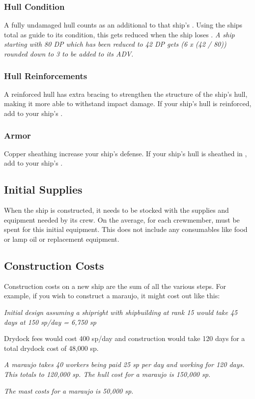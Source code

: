 \begin{multicols*}{2}
\subsubsection{Hull Condition}
A fully undamaged hull counts as an additional  to that ship’s \ADV. Using the ships \DP total as guide to its condition, this gets reduced when the ship loses \DP. \textit{A ship starting with 80 DP which has been reduced to 42 DP gets (6 x (42 / 80)) rounded down to 3 to be added to its ADV.}
\subsubsection{Hull Reinforcements}
A reinforced hull has extra bracing to strengthen the structure of the ship’s hull, making it more able to withstand impact damage. If your ship’s hull is reinforced, add  to your ship’s \ADV.
\subsubsection{Armor}
Copper sheathing increase your ship’s defense. If your ship’s hull is sheathed in , add  to your ship’s \ADV.
\subsection{Initial Supplies}
When the ship is constructed, it needs to be stocked with the supplies and equipment needed by its crew. On the average, for each crewmember, \result{200 sp} must be spent for this initial equipment. This does not include any consumables like food or lamp oil or replacement equipment.
\subsection{Construction Costs}
Construction costs on a new ship are the sum of all
the various steps. For example, if you wish to construct a
maraujo, it might cost out like this:

\textit{Initial design assuming a shipright with shipbuilding at rank 15 would take 45 days at 150 sp/day = 6,750 sp}

Drydock fees would cost 400 sp/day and construction would take 120 days for a total drydock cost of 48,000 sp.

\textit{A maraujo takes 40 workers being paid 25 sp per day and working for 120 days. This totals to 120,000 sp. The hull cost for a maraujo is 150,000 sp.}

\textit{The mast costs for a maraujo is 50,000 sp.}


\end{multicols*}
